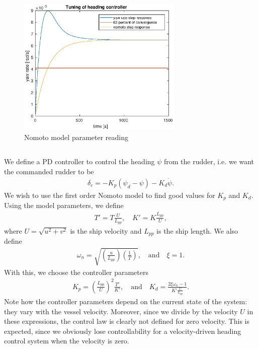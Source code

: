 \begin{figure}[H]
\centering
\includegraphics[width=0.7\textwidth]{nomoto-reading-improved}
\caption{Nomoto model parameter reading}
\label{fig:nomoto_reading}
\end{figure}


\subsection{}
We define a PD controller to control the heading $\psi$ from the rudder, i.e. we want the commanded rudder to be
\begin{equation}\begin{aligned}
\delta_c = -K_p (\psi_d - \psi) - K_d \dot \psi.
\end{aligned}\end{equation}
We wish to use the first order Nomoto model to find good values for $K_p$ and $K_d$. Using the model parameters, we define
\begin{equation}\begin{aligned}
T' = T \frac{U}{L_{pp}}, \quad K' = K \frac{L_{pp}}{U},
\end{aligned}\end{equation}
where $U = \sqrt{u^2 + v^2}$ is the ship velocity and $L_{pp}$ is the ship length. We also define
\begin{equation}\begin{aligned}
\omega_n = \sqrt{(\frac{u}{L_{pp}}) (\frac{1}{T})}, \quad \text{and} \quad \xi = 1.
\end{aligned}\end{equation}
With this, we choose the controller parameters
\begin{equation}\begin{aligned}
K_p = (\frac{L_{pp}}{U})^2 \frac{T'}{K'}, \quad \text{and} \quad
K_d = \frac{2 \xi \omega_n - 1}{K' \frac{U}{L_{pp}}}.
\end{aligned}\end{equation}
Note how the controller parameters depend on the current state of the system: they vary with the vessel velocity. Moreover, since we divide by the velocity $U$ in these expressions, the control law is clearly not defined for zero velocity. This is expected, since we obviously lose controllability for a velocity-driven heading control system when the velocity is zero.

